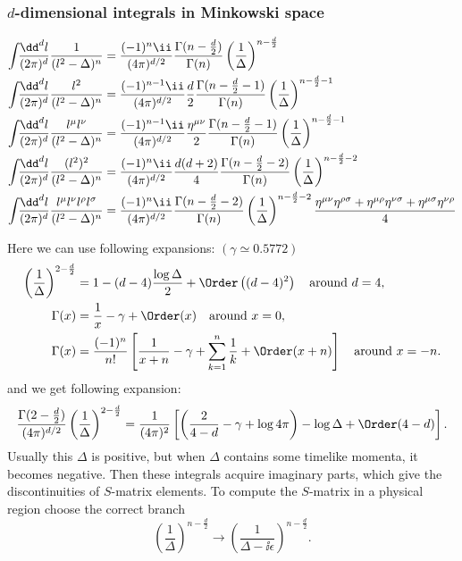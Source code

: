 \subsubsection{$d$-dimensional integrals in Minkowski space}\vspace{-2.5zw}
\begin{align}
 \intdP[d]{l}\frac1{(l^2-\Delta)^n}&=
\frac{(-1)^n\ii}{(4\pi)^{d/2}}\frac{\Gamma(n-\frac d2)}{\Gamma(n)}
\left(\frac1\Delta\right)^{n-\frac d2}
\\
 \intdP[d]{l}\frac{l^2}{(l^2-\Delta)^n}&=
\frac{(-1)^{n-1}\ii}{(4\pi)^{d/2}}\frac d2\frac{\Gamma(n-\frac d2-1)}{\Gamma(n)}
\left(\frac1\Delta\right)^{n-\frac d2-1}
\\
 \intdP[d]{l}\frac{l^\mu l^\nu}{(l^2-\Delta)^n}&=
\frac{(-1)^{n-1}\ii}{(4\pi)^{d/2}}\frac {\Hmn}2\frac{\Gamma(n-\frac d2-1)}{\Gamma(n)}
\left(\frac1\Delta\right)^{n-\frac d2-1}
\\
 \intdP[d]{l}\frac{(l^2)^2}{(l^2-\Delta)^n}&=
\frac{(-1)^n\ii}{(4\pi)^{d/2}}\frac{d(d+2)}4\frac{\Gamma(n-\frac d2-2)}{\Gamma(n)}
\left(\frac1\Delta\right)^{n-\frac d2-2}
\\
 \intdP[d]{l}\frac{l^\mu l^\nu l^\rho l^\sigma}{(l^2-\Delta)^n}&=
\frac{(-1)^n\ii}{(4\pi)^{d/2}}\frac{\Gamma(n-\frac d2-2)}{\Gamma(n)}
\left(\frac1\Delta\right)^{n-\frac d2-2}
\frac{\Hmn\Hrs+\Hmr\Hns+\Hms\Hnr}4
\end{align}

Here we can use following expansions: \qquad $(\gamma\simeq 0.5772)$
\begin{align}
 \left(\frac{1}{\Delta}\right)^{2-\frac d2} &=
 1 - (d-4)\frac{\log\Delta}{2} + \Order\left((d-4)^2\right)\quad\text{around $d=4$},
\\
 \Gamma(x)&=
 \frac{1}{x} - \gamma + \Order(x)\quad\text{around $x=0$},
\\
 \Gamma(x)&=
 \frac{(-1)^n}{n!}\left[ \frac{1}{x+n} - \gamma +
 \sum_{k=1}^{n}\frac{1}{k} + \Order(x+n)\right]
\quad\text{around $x=-n$}.
\end{align}
and we get following expansion:
\begin{equation}
 \frac{\Gamma(2-\frac  d2)}{(4\pi)^{d/2}}\left(\frac1\Delta\right)^{2-\frac d2}
= \frac1{(4\pi)^2}\left[\left(\frac{2}{4-d} - \gamma + \log4\pi \right)
                   - \log \Delta + \Order(4-d) \right].
\end{equation}
Usually this $\Delta$ is positive, but when $\Delta$ contains some
timelike momenta, it becomes negative. Then these integrals acquire
imaginary parts, which give the discontinuities of $S$-matrix elements.
To compute the $S$-matrix in a physical region choose the correct branch
\begin{equation}
 \left(\frac1\Delta\right)^{n-\frac d2}\to
 \left(\frac1{\Delta-\ii\epsilon}\right)^{n-\frac d2}.
\end{equation}


